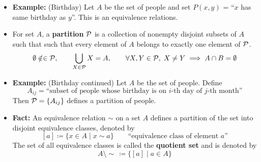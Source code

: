 \documentclass[11pt,twoside]{report}
\begin{document}
\begin{itemize}
\item \textbf{Example:} (Birthday) Let $A$ be the set of people and set $P(x,y)$ = ``$x$ has same birthday as $y$''. This is an equivalence relations. 

\item  For set $A$, a  \textbf{partition} $\mathcal{P}$  is a collection of nonempty disjoint subsets of $A$ such that such that every element of $A$ belongs to exactly one  element of $\mathcal{P}$. 
\[
\emptyset \notin \in \mathcal{P}, \qquad  \bigcup_{X  \in \mathcal{P} } X  = A , \qquad    \forall X, Y \in \mathcal{P}, \; X \ne Y  \implies A \cap B = \emptyset
 \]

\item \textbf{Example:} (Birthday continued) Let $A$ be the set of people. %
Define
\[
A_{ij} = \text{``subset of people whose birthday is on $i$-th day of $j$-th month''}
\]
Then $\mathcal{P} = \{ A_{ij} \}$ defines a partition of people. 


\item \textbf{Fact:} An equivalence relation $\sim$  on a set $A$ defines a partition of the set into disjoint equivalence classes, denoted by 
\[
[a] \coloneqq \{ x \in A \mid x \sim a\}  \qquad \text{``equivalence class of element $a$''} 
\]
The set of all equivalence classes is called the \textbf{quotient set} and is denoted by 
\[
A \setminus \sim\,  \coloneqq\{ [a] \mid a \in A\} 
\]


\end{itemize}
\end{document}
